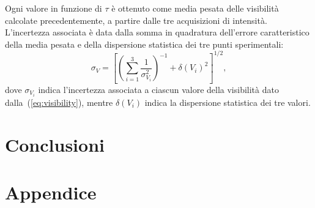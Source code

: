 \documentclass[10pt,oneside,a4paper]{article}
\newenvironment{Figure}
  {\par\medskip\noindent\minipage{\linewidth}}
  {\endminipage\par\medskip}
\begin{document}
\begin{multicols}{2}
Ogni valore in funzione di $\tau$ è ottenuto come media pesata delle visibilità calcolate precedentemente, a partire dalle tre acquisizioni di intensità. L'incertezza associata è data dalla somma in quadratura dell'errore caratteristico della media pesata e della dispersione statistica dei tre punti sperimentali:
\[
\sigma_V = \left[ \left( \sum_{i=1}^3 \frac{1}{\sigma_\text{$V_i$}^2}\right)^{-1} + \delta(V_i)^2 \right]^{1/2}, 
\]
dove $\sigma_\text{$V_i$}$ indica l'incertezza associata a ciascun valore della visibilità dato dalla~(\ref{eq:visibility}), mentre $\delta(V_i)$ indica la dispersione statistica dei tre valori.






\section{Conclusioni}


\end{multicols}

\section{Appendice}



\end{document}
